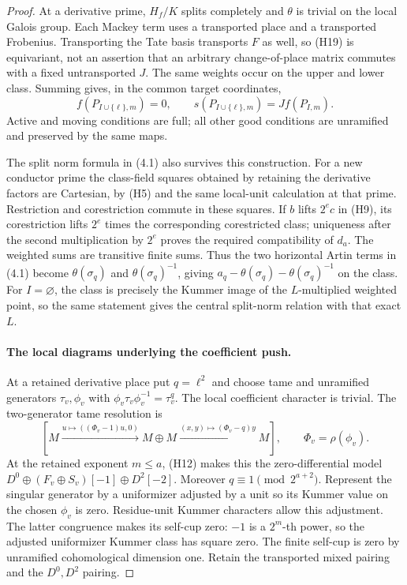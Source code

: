 \documentclass[11pt]{article}
\theoremstyle{definition}
\theoremstyle{remark}
\begin{document}
\begin{proof}
At a derivative prime, $H_f/K$ splits completely and $\theta$
is trivial on the local Galois group. Each Mackey term uses a
transported place and a transported Frobenius. Transporting the
Tate basis transports $F$ as well, so (H19) is equivariant,
not an assertion that an arbitrary change-of-place matrix
commutes with a fixed untransported $J$. The same weights occur
on the upper and lower class. Summing gives, in the common target coordinates,
\[
 f(P_{I\cup\{\ell\},m})=0,\qquad
 s(P_{I\cup\{\ell\},m})=Jf(P_{I,m}).\tag{4.2}
\] Active and moving conditions are full; all other
good conditions are unramified and preserved by the same maps.

The split norm formula in (4.1) also survives this construction.
For a new conductor prime the class-field squares obtained by
retaining the derivative factors are Cartesian, by (H5) and the
same local-unit calculation at that prime. Restriction and
corestriction commute in these squares. If $b$ lifts $2^e c$
in (H9), its corestriction lifts $2^e$ times the corresponding
corestricted class; uniqueness after the second multiplication
by $2^e$ proves the required compatibility of $d_a$.
The weighted sums are transitive finite sums. Thus the two
horizontal Artin terms in (4.1) become $\theta(\sigma_q)$ and
$\theta(\sigma_q)^{-1}$, giving
$a_q-\theta(\sigma_q)-\theta(\sigma_q)^{-1}$ on the class.
For $I=\varnothing$, the class is precisely the Kummer image of
the $L$-multiplied weighted point, so the same statement gives
the central split-norm relation with that exact $L$.

\paragraph{The local diagrams underlying the coefficient push.}
At a retained derivative place put $q=\ell^2$ and choose tame
and unramified generators $\tau_v,\phi_v$ with
$\phi_v\tau_v\phi_v^{-1}=\tau_v^q$. The local coefficient
character is trivial. The two-generator tame resolution is
\[
 [M\xrightarrow{u\mapsto((\Phi_v-1)u,0)}M\oplus M
       \xrightarrow{(x,y)\mapsto(\Phi_v-q)y}M],
 \qquad \Phi_v=\rho(\phi_v).
\]
At the retained exponent $m\le a$, (H12) makes this the
zero-differential model $D^0\oplus(F_v\oplus S_v)[-1]
\oplus D^2[-2]$. Moreover $q\equiv1\pmod{2^{a+2}}$.
Represent the singular generator by a uniformizer adjusted by
a unit so its Kummer value on the chosen $\phi_v$ is zero.
Residue-unit Kummer characters allow this adjustment. The latter
congruence makes its self-cup zero: $-1$ is a $2^m$-th power,
so the adjusted uniformizer Kummer class has square zero. The finite self-cup is zero by unramified cohomological
dimension one. Retain the transported mixed pairing and the
$D^0,D^2$ pairing.


\end{proof}
\end{document}
